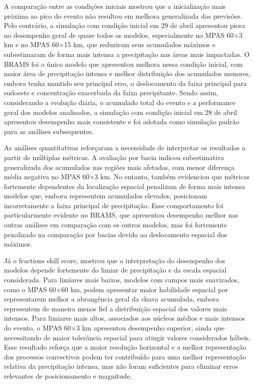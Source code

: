 \documentclass[12pt,a4paper,oneside]{book}
\begin{document}
A comparação entre as condições iniciais mostrou que a inicialização mais próxima ao pico do evento não resultou em melhora generalizada das previsões. Pelo contrário, a simulação com condição inicial em 29 de abril apresentou piora no desempenho geral de quase todos os modelos, especialmente no MPAS 60$\times$3 km e no MPAS 60$\times$15 km, que reduziram seus acumulados máximos e subestimaram de forma mais intensa a precipitação nas áreas mais impactadas. O BRAMS foi o único modelo que apresentou melhora nessa condição inicial, com maior área de precipitação intensa e melhor distribuição dos acumulados menores, embora tenha mantido seu principal erro, o deslocamento da faixa principal para sudoeste e concentração exacerbada da faixa precipitante. Sendo assim, considerando a evolução diária, o acumulado total do evento e a performance geral dos modelos analisados, a simulação com condição inicial em 28 de abril apresentou desempenho mais consistente e foi adotada como simulação padrão para as análises subsequentes.

As análises quantitativas reforçaram a necessidade de interpretar os resultados a partir de múltiplas métricas. A avaliação por bacia indicou subestimativa generalizada dos acumulados nas regiões mais afetadas, com menor diferença média negativa no MPAS 60$\times$3 km. No entanto, também evidenciou que métricas fortemente dependentes da localização espacial penalizam de forma mais intensa modelos que, embora representem acumulados elevados, posicionam incorretamente a faixa principal de precipitação. Esse comportamento foi particularmente evidente no BRAMS, que apresentou desempenho melhor nas outras análises em comparação com os outros modelos, mas foi fortemente penalizado na comparação por bacias devido ao deslocamento espacial dos máximos.

Já o fractions skill score, mostrou que a interpretação do desempenho dos modelos depende fortemente do limiar de precipitação e da escala espacial considerada. Para limiares mais baixos, modelos com campos mais suavizados, como o MPAS 60$\times$60 km, podem apresentar maior habilidade espacial por representarem melhor a abrangência geral da chuva acumulada, embora representem de maneira menos fiel a distribuição espacial dos valores mais intensos. Para limiares mais altos, associados aos núcleos médios e mais intensos do evento, o MPAS 60$\times$3 km apresentou desempenho superior, ainda que necessitando de maior tolerância espacial para atingir valores considerados hábeis. Esse resultado reforça que a maior resolução horizontal e a melhor representação dos processos convectivos podem ter contribuído para uma melhor representação relativa da precipitação intensa, mas não foram suficientes para eliminar erros relevantes de posicionamento e magnitude.
\end{document}

